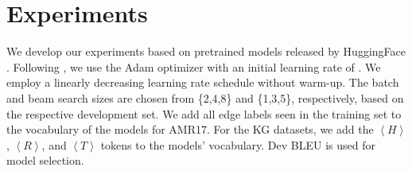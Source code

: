 \documentclass[11pt,a4paper]{article}
\newcommand{\ourtag}[1]{\ensuremath{\left\langle #1 \right\rangle}}
\begin{document}
\section{Experiments}



We develop our experiments based on pretrained models released by HuggingFace \citep{wolf2019huggingfaces}. Following \citet{wolf2019huggingfaces}, we use the Adam optimizer \cite{kingma:adam} with an initial learning rate of . We employ a linearly decreasing learning rate schedule without warm-up. The batch and beam search sizes are chosen from \{2,4,8\} and \{1,3,5\}, respectively, based on the respective development set. We add all edge labels seen in the training set to the vocabulary of the models for AMR17. For the KG datasets, we add the \ourtag{H}, \ourtag{R}, and \ourtag{T} tokens to the models' vocabulary. Dev BLEU is used for model selection. 
\end{document}
